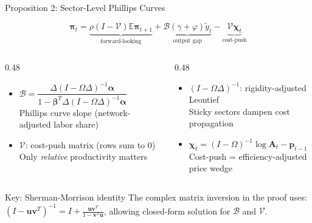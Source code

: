 \documentclass[aspectratio=169]{beamer}
\begin{document}
\begin{frame}{Proposition 2: Sector-Level Phillips Curves}

\begin{equation*}
    \bm{\pi}_t = \underbrace{\rho(I-\mathcal{V})\mathbb{E}\bm{\pi}_{t+1}}_{\text{forward-looking}} + \underbrace{\mathcal{B}(\gamma+\varphi)\tilde{y}_t}_{\text{output gap}} - \underbrace{\mathcal{V}\bm{\chi}_t}_{\text{cost-push}}
\end{equation*}

\begin{columns}
\begin{column}{0.48\textwidth}
\begin{itemize}
    \item $\mathcal{B} = \dfrac{\Delta(I-\Omega\Delta)^{-1}\bm{\alpha}}{1 - \bm{\beta}^T\Delta(I-\Omega\Delta)^{-1}\bm{\alpha}}$\\[4pt]
    Phillips curve slope (network-adjusted labor share)
    \vspace{4pt}
    \item $\mathcal{V}$: cost-push matrix (rows sum to 0)\\
    Only \textit{relative} productivity matters
\end{itemize}
\end{column}
\begin{column}{0.48\textwidth}
\begin{itemize}
    \item $(I-\Omega\Delta)^{-1}$: rigidity-adjusted Leontief\\[4pt]
    Sticky sectors dampen cost propagation
    \vspace{4pt}
    \item $\bm{\chi}_t = (I-\Omega)^{-1}\log\mathbf{A}_t - \bm{p}_{t-1}$\\[4pt]
    Cost-push = efficiency-adjusted price wedge
\end{itemize}
\end{column}
\end{columns}

\vspace{0.3cm}
\begin{alertblock}{Key: Sherman-Morrison identity}
The complex matrix inversion in the proof uses: $(I - \mathbf{u}\mathbf{v}^T)^{-1} = I + \frac{\mathbf{u}\mathbf{v}^T}{1-\mathbf{v}^T\mathbf{u}}$, allowing closed-form solution for $\mathcal{B}$ and $\mathcal{V}$.
\end{alertblock}
\end{frame}
\end{document}
